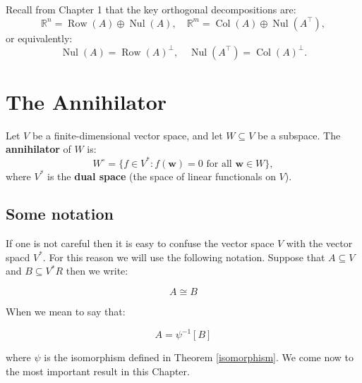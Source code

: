 \documentclass[11pt]{article}
\begin{document}
Recall from Chapter 1 that
the key orthogonal decompositions are:
\[
\mathbb{R}^n = \operatorname{Row}(A) \oplus \operatorname{Nul}(A), \quad
\mathbb{R}^m = \operatorname{Col}(A) \oplus \operatorname{Nul}(A^\top),
\]
or equivalently:
\[
\operatorname{Nul}(A) = \operatorname{Row}(A)^\perp, \quad
\operatorname{Nul}(A^\top) = \operatorname{Col}(A)^\perp.
\]

\section*{\Large The Annihilator}

Let $ V $ be a finite-dimensional vector space, and let $ W \subseteq V $ be a subspace.  
The \textbf{annihilator} of $ W $ is:
\[
W^\circ = \{ f \in V^* : f(\mathbf{w}) = 0 \text{ for all } \mathbf{w} \in W \},
\]
where $ V^* $ is the \textbf{dual space} (the space of linear functionals on $ V $).


\subsection{\Large Some notation}

If one is not careful then it is easy to confuse the vector space $V$ with the vector spacd $V^*$. For this reason we will use the following notation. Suppose that $A \subseteq V$ and $B \subseteq V^*R$ then we write:

\[ A \cong B \]

When we mean to say that: 

\[A = \psi^{-1} [B]\]

where $\psi$ is the isomorphism defined in Theorem \ref{isomorphism}. We come now to the most important result in this Chapter.
\end{document}
